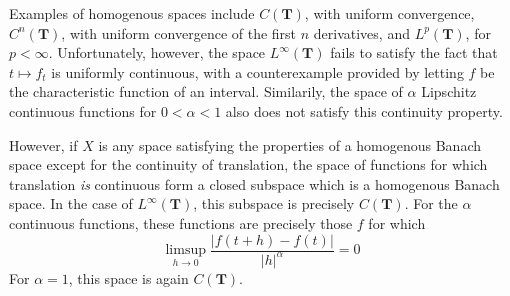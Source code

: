 Examples of homogenous spaces include $C(\mathbf{T})$, with uniform convergence, $C^n(\mathbf{T})$, with uniform convergence of the first $n$ derivatives, and $L^p(\mathbf{T})$, for $p < \infty$. Unfortunately, however, the space $L^\infty(\mathbf{T})$ fails to satisfy the fact that $t \mapsto f_t$ is uniformly continuous, with a counterexample provided by letting $f$ be the characteristic function of an interval. Similarily, the space of $\alpha$ Lipschitz continuous functions for $0 < \alpha < 1$ also does not satisfy this continuity property.

However, if $X$ is any space satisfying the properties of a homogenous Banach space except for the continuity of translation, the space of functions for which translation {\it is} continuous form a closed subspace which is a homogenous Banach space. In the case of $L^\infty(\mathbf{T})$, this subspace is precisely $C(\mathbf{T})$. For the $\alpha$ continuous functions, these functions are precisely those $f$ for which
%
\[ \limsup_{h \to 0} \frac{|f(t+h) - f(t)|}{|h|^\alpha} = 0 \]
%
For $\alpha = 1$, this space is again $C(\mathbf{T})$.

